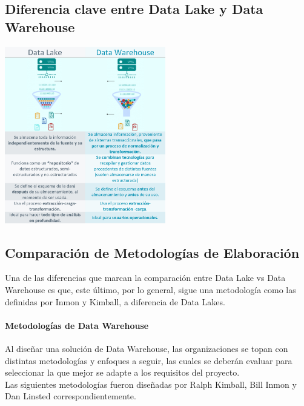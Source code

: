 \documentclass[twoside,twocolumn]{article}
\begin{document}
\subsection{Diferencia clave entre Data Lake y Data Warehouse}
\begin{center}
    \includegraphics[width=7cm]{./img/img3.png}
\end{center}

\subsection{Comparación de Metodologías de Elaboración}
\noindent Una de las diferencias que marcan la comparación entre Data Lake vs Data Warehouse es que, este último, por lo general, sigue una metodología como las definidas por Inmon y Kimball, a diferencia de Data Lakes.
\paragraph{\Large Metodologías de Data Warehouse \\[0.1in]}
Al diseñar una solución de Data Warehouse, las organizaciones se topan con distintas metodologías y enfoques a seguir, las cuales se deberán evaluar para seleccionar la que mejor se adapte a los requisitos del proyecto.\\[0.1in]
Las siguientes metodologías fueron diseñadas por Ralph Kimball, Bill Inmon y Dan Linsted correspondientemente.\\[0.1in]
\end{document}
